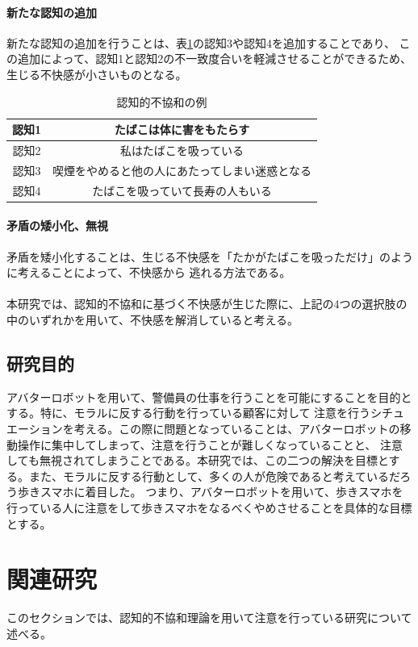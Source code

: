 \documentclass[11pt,a4j]{jreport}
\begin{document}
\subsubsection{新たな認知の追加}
新たな認知の追加を行うことは、表\ref{fig: CDTExample2}の認知3や認知4を追加することであり、
この追加によって、認知1と認知2の不一致度合いを軽減させることができるため、生じる不快感が小さいものとなる。
\begin{table}[h]
  \centering
  \caption{認知的不協和の例}
  \label{fig: CDTExample2}
  \begin{tabular}{c|c}
      認知1 & たばこは体に害をもたらす  \\ \hline
      認知2 & 私はたばこを吸っている \\ \hline
      認知3 & 喫煙をやめると他の人にあたってしまい迷惑となる \\ \hline
      認知4 & たばこを吸っていて長寿の人もいる \\
  \end{tabular}
\end{table}
\subsubsection{矛盾の矮小化、無視}
矛盾を矮小化することは、生じる不快感を「たかがたばこを吸っただけ」のように考えることによって、不快感から
逃れる方法である。

\subsubsection{}
本研究では、認知的不協和に基づく不快感が生じた際に、上記の4つの選択肢の中のいずれかを用いて、不快感を解消していると考える。

\section{研究目的}
アバターロボットを用いて、警備員の仕事を行うことを可能にすることを目的とする。特に、モラルに反する行動を行っている顧客に対して
注意を行うシチュエーションを考える。この際に問題となっていることは、アバターロボットの移動操作に集中してしまって、注意を行うことが難しくなっていることと、
注意しても無視されてしまうことである。本研究では、この二つの解決を目標とする。また、モラルに反する行動として、多くの人が危険であると考えているだろう歩きスマホに着目した。
つまり、アバターロボットを用いて、歩きスマホを行っている人に注意をして歩きスマホをなるべくやめさせることを具体的な目標とする。


\chapter{関連研究}
このセクションでは、認知的不協和理論を用いて注意を行っている研究について述べる。
\end{document}
